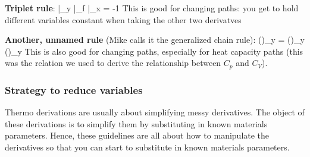 \documentclass[12pt]{article}
\begin{document}
\textbf{Triplet rule}:
\eqs
{}|_y |_f |_x = -1
\eqe
This is good for changing paths: you get to hold different variables constant when taking the other two derivatves

\textbf{Another, unnamed rule} (Mike calls it the generalized chain rule):
\eqs
\left(\right)_y = \left(\right)_y \left(\right)_y
\eqe
This is also good for changing paths, especially for heat capacity paths (this was the relation we used to derive the relationship between $C_p$ and $C_V$).
\subsubsection{Strategy to reduce variables}
Thermo derivations are usually about simplifying messy derivatives. The object of these derivations is to simplify them by substituting in known materials parameters. Hence, these guidelines are all about how to manipulate the derivatives so that you can start to substitute in known materials parameters.
\end{document}
